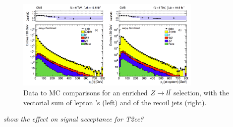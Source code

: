 \begin{figure}[h]
  \begin{center}
    \includegraphics[width=0.8\textwidth]{Figs/isr/isr_zjets_distros.pdf}
    \caption{Data to MC comparisons for an enriched $Z \rightarrow l\bar{l}$ selection, 
    with the vectorial sum of lepton \Pt's (left) and of the recoil jets (right).
    \cite{susy-isrrw}}
    \label{fig:isr_datamc}
  \end{center}
\end{figure}

\emph{show the effect on signal acceptance for T2cc?}


